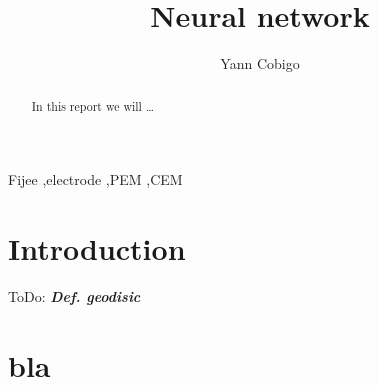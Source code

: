 \documentclass[final, paper=letter,5p,times,twocolumn]{elsarticle}
\newcommand{\ToDo}[1]{ToDo: \textbf{\textit{#1}}}
\begin{document}
\begin{frontmatter}

\title{Neural network}

\author[label1]{Yann Cobigo}
\address[label1]{University of California, San Francisco | ucsf.edu}




\begin{abstract}
In this report we will \dots
\end{abstract}

\begin{keyword}
Fijee \sep electrode \sep PEM \sep CEM
\end{keyword}

\end{frontmatter}


\section{Introduction}


\ToDo{Def. geodisic} \\

\section{bla}
\end{document}
